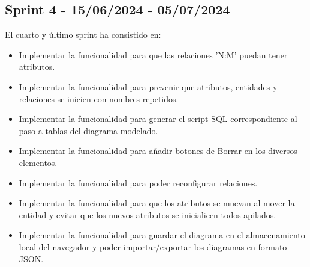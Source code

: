 \subsection{Sprint 4 - 15/06/2024 - 05/07/2024 }
El cuarto y último sprint ha consistido en:
\begin{itemize}
    \item Implementar la funcionalidad para que las relaciones 'N:M' puedan tener atributos.
    \item Implementar la funcionalidad para prevenir que atributos, entidades y relaciones se inicien con nombres repetidos.
    \item Implementar la funcionalidad para generar el script SQL correspondiente al paso a tablas del diagrama modelado.
    \item Implementar la funcionalidad para añadir botones de Borrar en los diversos elementos.
    \item Implementar la funcionalidad para poder reconfigurar relaciones.
    \item Implementar la funcionalidad para que los atributos se muevan al mover la entidad y evitar que los nuevos atributos se inicialicen todos apilados.
    \item Implementar la funcionalidad para guardar el diagrama en el almacenamiento local del navegador y poder importar/exportar los diagramas en formato JSON.
\end{itemize}


